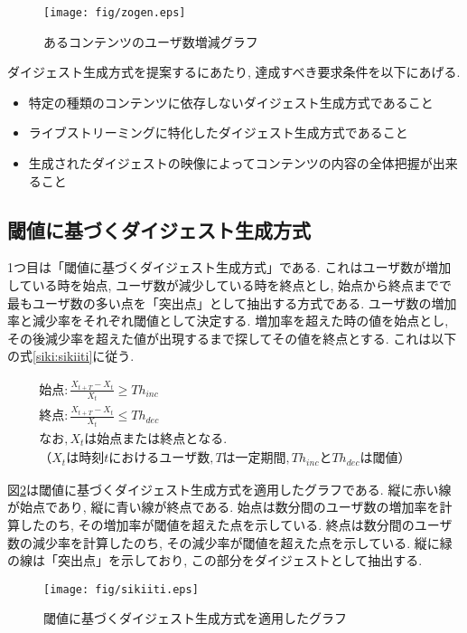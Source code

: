 \begin{figure}[h]
  \centering
  \texttt{[image: fig/zogen.eps]}
  \caption{あるコンテンツのユーザ数増減グラフ}
  \label{fig:zogen}
\end{figure}

ダイジェスト生成方式を提案するにあたり, 達成すべき要求条件を以下にあげる.

\begin{itemize}
\item 特定の種類のコンテンツに依存しないダイジェスト生成方式であること
\item ライブストリーミングに特化したダイジェスト生成方式であること
\item 生成されたダイジェストの映像によってコンテンツの内容の全体把握が出来ること
\end{itemize}

\newpage

\subsection{閾値に基づくダイジェスト生成方式}\label{subsec:pro-sikiiti}
1つ目は「閾値に基づくダイジェスト生成方式」である. これはユーザ数が増加している時を始点, ユーザ数が減少している時を終点とし, 始点から終点までで最もユーザ数の多い点を「突出点」として抽出する方式である. ユーザ数の増加率と減少率をそれぞれ閾値として決定する. 増加率を超えた時の値を始点とし, その後減少率を超えた値が出現するまで探してその値を終点とする.  これは以下の式\ref{siki:sikiiti}に従う.

\begin{eqnarray}
始点: \frac{X_{t+T}-X_{t}}{X_{t}} \geq Th_{inc} \nonumber \\
終点: \frac{X_{t+T}-X_{t}}{X_{t}} \leq Th_{dec} \nonumber \\
なお, X_{t}は始点または終点となる. \nonumber \\
（X_{t}は時刻tにおけるユーザ数,Tは一定期間, Th_{inc}とTh_{dec}は閾値）&&
\label{siki:sikiiti}
\end{eqnarray}


図\ref{fig:sikiiti}は閾値に基づくダイジェスト生成方式を適用したグラフである. 縦に赤い線が始点であり, 縦に青い線が終点である. 始点は数分間のユーザ数の増加率を計算したのち, その増加率が閾値を超えた点を示している. 終点は数分間のユーザ数の減少率を計算したのち, その減少率が閾値を超えた点を示している. 縦に緑の線は「突出点」を示しており, この部分をダイジェストとして抽出する.

\begin{figure}[h]
  \centering
  \texttt{[image: fig/sikiiti.eps]}
  \caption{閾値に基づくダイジェスト生成方式を適用したグラフ}
  \label{fig:sikiiti}
\end{figure}

